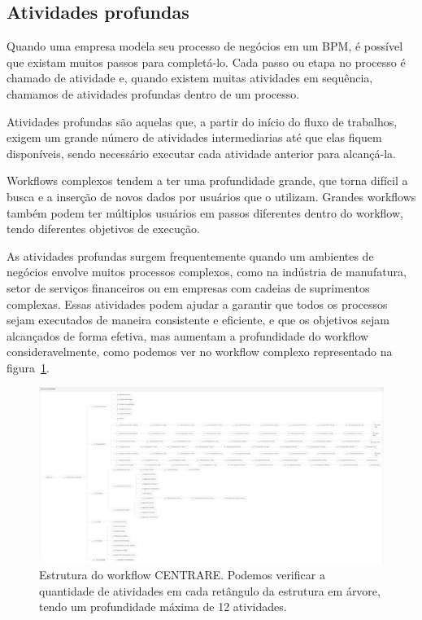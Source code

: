 \subsection{Atividades profundas} \label{sec:deep_activities}


Quando uma empresa modela seu processo de negócios em um BPM, é possível que existam muitos passos para completá-lo. Cada passo ou etapa no processo é chamado de atividade e, quando existem muitas atividades em sequência, chamamos de atividades profundas dentro de um processo.

Atividades profundas são aquelas que, a partir do início do fluxo de trabalhos, exigem um grande número de atividades intermediarias até que elas fiquem disponíveis, sendo necessário executar cada atividade anterior para alcançá-la.


Workflows complexos tendem a ter uma profundidade grande, que torna difícil a busca e a inserção de novos dados por usuários que o utilizam. Grandes workflows também podem ter múltiplos usuários em passos diferentes dentro do workflow, tendo diferentes objetivos de execução.

As atividades profundas surgem frequentemente quando um ambientes de negócios envolve muitos processos complexos, como na indústria de manufatura, setor de serviços financeiros ou em empresas com cadeias de suprimentos complexas. Essas atividades podem ajudar a garantir que todos os processos sejam executados de maneira consistente e eficiente, e que os objetivos sejam alcançados de forma efetiva, mas aumentam a profundidade do workflow consideravelmente, como podemos ver no workflow complexo representado na figura~\ref{fig:centrareEstrutura}.

\begin{figure}
    \centering
    \includegraphics[width=1\textwidth]{imgs/CENTRARE/estrutura.png}
    \caption{Estrutura do workflow CENTRARE. Podemos verificar a quantidade de atividades em cada retângulo da estrutura em árvore, tendo um profundidade máxima de 12 atividades.}
    \label{fig:centrareEstrutura}
\end{figure}

